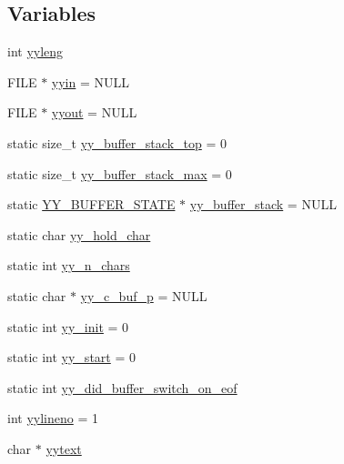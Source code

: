\subsection*{Variables}
\begin{DoxyCompactItemize}
\item 
int \hyperlink{_genesys_09_09-scanner_8cpp_a1b5865350b5ca5c1d69f429c2a652953}{yyleng}
\item 
F\-I\-L\-E $\ast$ \hyperlink{_genesys_09_09-scanner_8cpp_a87a127afa8f6c307fbfba10390675406}{yyin} = N\-U\-L\-L
\item 
F\-I\-L\-E $\ast$ \hyperlink{_genesys_09_09-scanner_8cpp_a296847b42b0baa62e2af36cb79f3c0eb}{yyout} = N\-U\-L\-L
\item 
static size\-\_\-t \hyperlink{_genesys_09_09-scanner_8cpp_ae54779a12769204c826899d0531e40e6}{yy\-\_\-buffer\-\_\-stack\-\_\-top} = 0
\item 
static size\-\_\-t \hyperlink{_genesys_09_09-scanner_8cpp_a437cdcd878686881404e320fd941929c}{yy\-\_\-buffer\-\_\-stack\-\_\-max} = 0
\item 
static \hyperlink{_genesys_09_09-scanner_8cpp_a4e5bd2d129903df83f3d13effaf8f3e4}{Y\-Y\-\_\-\-B\-U\-F\-F\-E\-R\-\_\-\-S\-T\-A\-T\-E} $\ast$ \hyperlink{_genesys_09_09-scanner_8cpp_a34b6ab3a3061471b6604dba48e47a101}{yy\-\_\-buffer\-\_\-stack} = N\-U\-L\-L
\item 
static char \hyperlink{_genesys_09_09-scanner_8cpp_a13f78e763996d2d86c85b45cbe146282}{yy\-\_\-hold\-\_\-char}
\item 
static int \hyperlink{_genesys_09_09-scanner_8cpp_aa86c122f2050dbfd365fcf547e6fc1c3}{yy\-\_\-n\-\_\-chars}
\item 
static char $\ast$ \hyperlink{_genesys_09_09-scanner_8cpp_ade8fc57d3529bff56440a4f3e9c29586}{yy\-\_\-c\-\_\-buf\-\_\-p} = N\-U\-L\-L
\item 
static int \hyperlink{_genesys_09_09-scanner_8cpp_aeae6dabf9dcc4769518ecf054181b1c8}{yy\-\_\-init} = 0
\item 
static int \hyperlink{_genesys_09_09-scanner_8cpp_a2e1e1d9ee4610a6679d49ed8194b00af}{yy\-\_\-start} = 0
\item 
static int \hyperlink{_genesys_09_09-scanner_8cpp_a57edb4569f96dcfce9deaff0eb6a6412}{yy\-\_\-did\-\_\-buffer\-\_\-switch\-\_\-on\-\_\-eof}
\item 
int \hyperlink{_genesys_09_09-scanner_8cpp_a5e36364965360da7b7cdfc2188e0af84}{yylineno} = 1
\item 
char $\ast$ \hyperlink{_genesys_09_09-scanner_8cpp_a35b96d819f6a8f8638894c429e68b02a}{yytext}

\end{DoxyCompactItemize}
